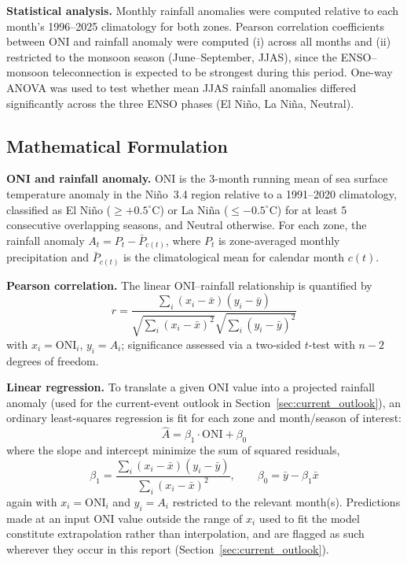 \documentclass{article}
\begin{document}
\textbf{Statistical analysis.} Monthly rainfall anomalies were computed relative to
each month's 1996--2025 climatology for both zones. Pearson correlation coefficients
between ONI and rainfall anomaly were computed (i) across all months and (ii)
restricted to the monsoon season (June--September, JJAS), since the ENSO--monsoon
teleconnection is expected to be strongest during this period. One-way ANOVA was used
to test whether mean JJAS rainfall anomalies differed significantly across the three
ENSO phases (El Ni\~{n}o, La Ni\~{n}a, Neutral).

\subsection{Mathematical Formulation}

\textbf{ONI and rainfall anomaly.} ONI is the 3-month running mean of sea surface
temperature anomaly in the Ni\~{n}o~3.4 region relative to a 1991--2020 climatology,
classified as El Ni\~{n}o ($\geq+0.5^{\circ}$C) or La Ni\~{n}a ($\leq-0.5^{\circ}$C) for
at least 5 consecutive overlapping seasons, and Neutral otherwise. For each zone, the
rainfall anomaly $A_t = P_t - \bar{P}_{c(t)}$, where $P_t$ is zone-averaged monthly
precipitation and $\bar{P}_{c(t)}$ is the climatological mean for calendar month $c(t)$.

\textbf{Pearson correlation.} The linear ONI--rainfall relationship is quantified by
\begin{equation}
r = \frac{\sum_i (x_i - \bar{x})(y_i - \bar{y})}
{\sqrt{\sum_i (x_i - \bar{x})^2}\sqrt{\sum_i (y_i - \bar{y})^2}}
\end{equation}
with $x_i=\text{ONI}_i$, $y_i=A_i$; significance assessed via a two-sided $t$-test with
$n-2$ degrees of freedom.

\textbf{Linear regression.} To translate a given ONI value into a projected rainfall
anomaly (used for the current-event outlook in
Section~\ref{sec:current_outlook}), an ordinary least-squares regression is fit for
each zone and month/season of interest:
\begin{equation}
\hat{A} = \beta_1 \cdot \text{ONI} + \beta_0
\end{equation}
where the slope and intercept minimize the sum of squared residuals,
\begin{equation}
\beta_1 = \frac{\sum_i (x_i-\bar{x})(y_i-\bar{y})}{\sum_i (x_i-\bar{x})^2}, \qquad
\beta_0 = \bar{y} - \beta_1 \bar{x}
\end{equation}
again with $x_i=\text{ONI}_i$ and $y_i=A_i$ restricted to the relevant month(s).
Predictions made at an input ONI value outside the range of $x_i$ used to fit the
model constitute extrapolation rather than interpolation, and are flagged as such
wherever they occur in this report (Section~\ref{sec:current_outlook}).
\end{document}
